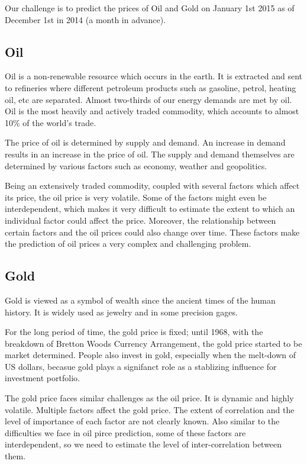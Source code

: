\documentclass[runningheads]{llncs}
\begin{document}
Our challenge is to predict the prices of Oil and Gold on January 1st 2015 as of December 1st in 2014 (a month in advance). 

\subsection{Oil}

Oil is a non-renewable resource which occurs in the earth. It is extracted and sent to refineries where different petroleum products such as gasoline, petrol, heating oil, etc are separated. Almost two-thirds of our energy demands are met by oil. Oil is the most heavily and actively traded commodity, which accounts to almost 10\% of the world's trade.

The price of oil is determined by supply and demand. An increase in demand results in an increase in the price of oil. The supply and demand themselves are determined by various factors such as economy, weather and geopolitics.

Being an extensively traded commodity, coupled with several factors which affect its price, the oil price is very volatile. Some of the factors might even be interdependent, which makes it very difficult to estimate the extent to which an individual factor could affect the price. Moreover, the relationship between certain factors and the oil prices could also change over time. These factors make the prediction of oil prices a very complex and challenging problem.

\subsection{Gold}
Gold is viewed as a symbol of wealth since the ancient times of the human history. It is widely used as jewelry and in some precision gages. 

For the long period of time, the gold price is fixed; until 1968, with the breakdown of Bretton Woods Currency Arrangement, the gold price started to be market determined. People also invest in gold, especially when the melt-down of US dollars, becasue gold plays a signifanct role as a stablizing influence for investment portfolio.

The gold price faces similar challenges as the oil price. It is dynamic and highly volatile. Multiple factors affect the gold price. The extent of correlation and the level of importance of each factor are not clearly known. Also similar to the difficulties we face in oil pirce prediction, some of these factors are interdependent, so we need to estimate the level of inter-correlation between them. 
\end{document}
